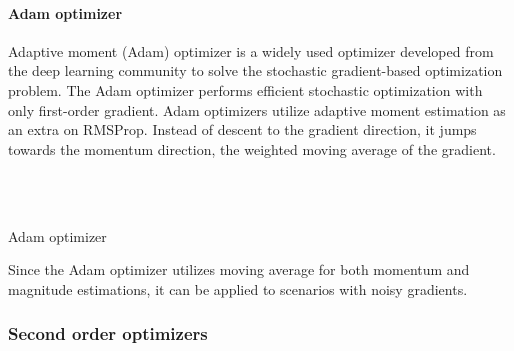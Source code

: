\vspace{0.5cm}



\paragraph{Adam optimizer}

Adaptive moment (Adam) optimizer \cite{kingma_adam_2017} is a widely used optimizer developed from the deep learning community to solve the stochastic gradient-based optimization problem. The Adam optimizer performs efficient stochastic optimization with only first-order gradient. Adam optimizers utilize adaptive moment estimation as an extra on RMSProp. Instead of descent to the gradient direction, it jumps towards the momentum direction, the weighted moving average of the gradient.

\vspace{0.5cm}


\begin{algorithm}[H]
\SetAlgoNoLine%
\\
\\
 \caption{Adam optimizer}
\end{algorithm}


\vspace{0.5cm}


Since the Adam optimizer utilizes moving average for both momentum and magnitude estimations, it can be applied to scenarios with noisy gradients.

\subsubsection{Second order optimizers} \label{sec:second_order_optimizers}

